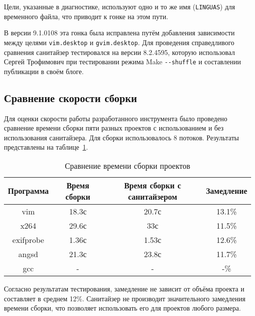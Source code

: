 

Цели, указанные в диагностике, используют одно и то же имя (\texttt{LINGUAS}) для временного файла, что приводит к гонке на этом пути.

В версии 9.1.0108 эта гонка была исправлена путём добавления зависимости между целями \texttt{vim.desktop} и \texttt{gvim.desktop}. Для проведения справедливого сравнения санитайзер тестировался на версии 8.2.4595, которую использовал Сергей Трофимович при тестировании режима Make \texttt{-{}-shuffle} и составлении публикации в своём блоге.

\subsection{Сравнение скорости сборки}

Для оценки скорости работы разработанного инструмента было проведено сравнение времени сборки пяти разных проектов с использованием и без использования санитайзера. Для сборки использовалось 8 потоков. Результаты представлены на таблице~\ref{tab:build_time}.

\begin{table}[H]
    \centering
    \begin{tabular}{cccc}
        \toprule
        Программа & Время сборки & Время сборки с санитайзером & Замедление \\
        \midrule
        vim & 18.3с & 20.7с & 13.1\% \\
        x264 & 29.6с & 33с & 11.5\% \\
        exifprobe & 1.36с & 1.53с & 12.6\% \\
        angsd & 21.3с & 23.8с & 11.7\% \\
        gcc & - & - & -\% \\
        \bottomrule
    \end{tabular}
    \caption{Сравнение времени сборки проектов}
    \label{tab:build_time}
\end{table}

Согласно результатам тестирования, замедление не зависит от объёма проекта и составляет в среднем 12\%. Санитайзер не производит значительного замедления времени сборки, что позволяет использовать его для проектов любого размера.

